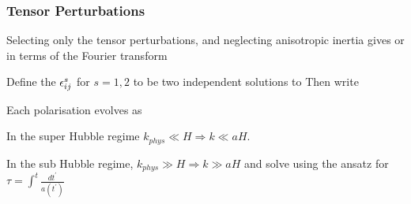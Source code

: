 \documentclass{article}
\begin{document}
\subsubsection{Tensor Perturbations}
Selecting only the tensor perturbations, and neglecting anisotropic inertia gives 
or in terms of the Fourier transform 

\begin{definition}
Define the  $\epsilon_{ij}^s$ for $s=1,2$ to be two independent solutions to 
Then write 
\end{definition}

Each polarisation evolves as 

In the super Hubble regime $k_{phys} \ll H \Rightarrow k \ll aH$. 

In the sub Hubble regime, $k_{phys} \gg H \Rightarrow k \gg aH$ and solve using the ansatz 
for $\tau = \int^t \frac{dt^\prime}{a(t^\prime)}$

\end{document}
